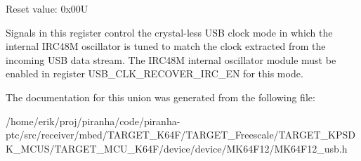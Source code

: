 Reset value\+: 0x00U

Signals in this register control the crystal-\/less U\+SB clock mode in which the internal I\+R\+C48M oscillator is tuned to match the clock extracted from the incoming U\+SB data stream. The I\+R\+C48M internal oscillator module must be enabled in register U\+S\+B\+\_\+\+C\+L\+K\+\_\+\+R\+E\+C\+O\+V\+E\+R\+\_\+\+I\+R\+C\+\_\+\+EN for this mode. 

The documentation for this union was generated from the following file\+:\begin{DoxyCompactItemize}
\item 
/home/erik/proj/piranha/code/piranha-\/ptc/src/receiver/mbed/\+T\+A\+R\+G\+E\+T\+\_\+\+K64\+F/\+T\+A\+R\+G\+E\+T\+\_\+\+Freescale/\+T\+A\+R\+G\+E\+T\+\_\+\+K\+P\+S\+D\+K\+\_\+\+M\+C\+U\+S/\+T\+A\+R\+G\+E\+T\+\_\+\+M\+C\+U\+\_\+\+K64\+F/device/device/\+M\+K64\+F12/M\+K64\+F12\+\_\+usb.\+h\end{DoxyCompactItemize}
